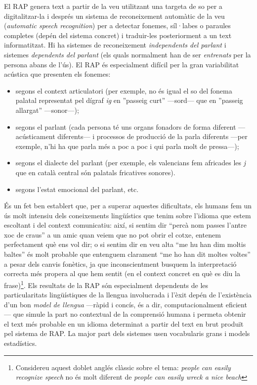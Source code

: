 El RAP genera text a partir de la veu utilitzant una targeta de so per
a digitalitzar-la i després un sistema de reconeixement
automàtic de la veu (\emph{automatic speech recognition}) per a
detectar fonemes, síl·labes o paraules completes (depén del
sistema concret) i traduir-les posteriorment a un text informatitzat.
Hi ha sistemes de reconeixement \emph{independents del parlant} i
sistemes \emph{dependents del parlant} (els quals normalment han de ser
\emph{entrenats} per la persona abans de l'ús).  El RAP és especialment
difícil per la gran variabilitat acústica que presenten els fonemes:
\begin{itemize}
\item segons el context articulatori (per exemple, no és igual el so del
fonema palatal representat pel dígraf \emph{ig}
en ''passeig curt'' ---sord--- que en ''passeig allargat''
---sonor---);
\item segons el parlant (cada persona té uns organs fonadors de forma
  diferent ---acústicament diferents---
  i processos de producció de la parla diferents ---per exemple, n'hi
  ha que parla més a poc a poc i qui parla molt de pressa---);
\item segons el dialecte del parlant (per exemple, els valencians fem
  africades les \emph{j} que en català central són palatals fricatives
  sonores).
\item segons l'estat emocional del parlant, etc.
\end{itemize}
És un fet ben establert que, per a superar aquestes dificultats, els
humans fem un ús molt intensiu dels coneixements lingüístics que tenim
sobre l'idioma que estem escoltant i del context comunicatiu: així, si
sentim dir ``percà nom passes l'antre xoc de craus'' a un amic quan
veiem que no pot obrir el cotxe, entenem perfectament què ens vol dir;
o si sentim dir en veu alta ``me hu han dim moltis baltes'' és molt
probable que entenguem clarament ``me ho han dit moltes voltes'' a
pesar dels canvis fonètics, ja que inconscientment busquem la
interpretació correcta més propera al que hem sentit (en el context
concret en què es diu la frase)\footnote{Considereu aquest doblet
  anglés clàssic sobre el tema: \emph{people can easily recognize
    speech} no és molt diferent de \emph{people can easily wreck a nice
    beach}}. Els resultats de la RAP són especialment dependents de
les particularitats lingüístiques de la llengua involucrada i l'èxit
depén de l'existència d'un bon \emph{model de llengua} ---ràpid i
concís, és a dir, computacionalment eficient--- que simule la part no
contextual de la comprensió humana i permeta obtenir el text més
probable en un idioma determinat a partir del text en brut produït pel
sistema de RAP. La major part dels sistemes usen vocabularis grans i
models estadístics.


